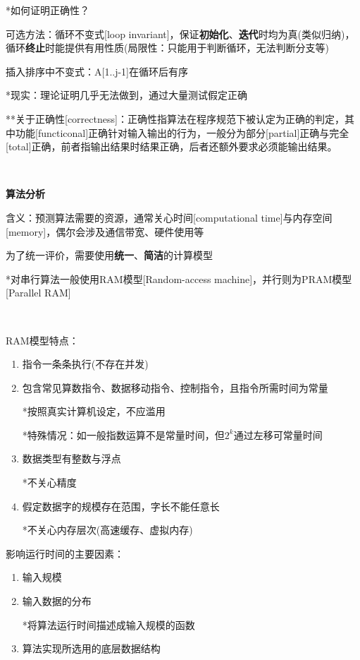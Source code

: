 \documentclass[a4paper,UTF8,fontset=windows]{ctexart}
\begin{document}
*\hspace{0em}如何证明正确性？

可选方法：循环不变式[loop invariant]，保证\textbf{初始化}、\textbf{迭代}时均为真(类似归纳)，循环\textbf{终止}时能提供有用性质(局限性：只能用于判断循环，无法判断分支等)

插入排序中不变式：A[1..j-1]在循环后有序

*\hspace{0em}现实：理论证明几乎无法做到，通过大量测试假定正确

**\hspace{0em}关于正确性[correctness]：正确性指算法在程序规范下被认定为正确的判定，其中功能[functiconal]正确针对输入输出的行为，一般分为部分[partial]正确与完全[total]正确，前者指输出结果时结果正确，后者还额外要求必须能输出结果。

\

\textbf{算法分析}

含义：预测算法需要的资源，通常关心时间[computational time]与内存空间[memory]，偶尔会涉及通信带宽、硬件使用等

为了统一评价，需要使用\textbf{统一}、\textbf{简洁}的计算模型

*\hspace{0em}对串行算法一般使用RAM模型[Random-access machine]，并行则为PRAM模型[Parallel RAM]

\

RAM模型特点：
\begin{enumerate}
    \item 指令一条条执行(不存在并发)
    \item 包含常见算数指令、数据移动指令、控制指令，且指令所需时间为常量
    
        *\hspace{0em}按照真实计算机设定，不应滥用

        *\hspace{0em}特殊情况：如一般指数运算不是常量时间，但$2^k$通过左移可常量时间
    
    \item 数据类型有整数与浮点
        
        *\hspace{0em}不关心精度

    \item 假定数据字的规模存在范围，字长不能任意长
    
        *\hspace{0em}不关心内存层次(高速缓存、虚拟内存)
\end{enumerate}

影响运行时间的主要因素：
\begin{enumerate}
    \item 输入规模
    \item 输入数据的分布
    
        *\hspace{0em}将算法运行时间描述成输入规模的函数

    \item 算法实现所选用的底层数据结构
\end{enumerate}
\end{document}
